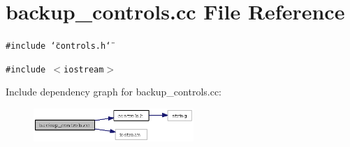 \section{backup\_\-controls.cc File Reference}
\label{backup__controls_8cc}
{\tt \#include \char`\"{}controls.h\char`\"{}}\par
{\tt \#include $<$iostream$>$}\par


Include dependency graph for backup\_\-controls.cc:\begin{figure}[H]
\begin{center}
\leavevmode
\includegraphics[width=172pt]{backup__controls_8cc__incl}
\end{center}
\end{figure}
